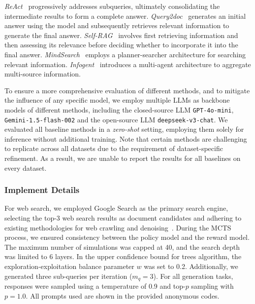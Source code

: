 \quad
\textit{ReAct}~\cite{yao2023react} progressively addresses subqueries, ultimately consolidating the intermediate results to form a complete answer.
\textit{Query2doc}~\cite{wang2023query2doc} generates an initial answer using the model and subsequently retrieves relevant information to generate the final answer.
\textit{Self-RAG}~\cite{asaiself} involves first retrieving information and then assessing its relevance before deciding whether to incorporate it into the final answer.
\textit{MindSearch}~\cite{chen2024mindsearch} employs a planner-searcher architecture for searching relevant information.
\textit{Infogent}~\cite{reddy2024infogent} introduces a multi-agent architecture to aggregate multi-source information.


To ensure a more comprehensive evaluation of different methods, and to mitigate the influence of any specific model, we employ multiple LLMs as backbone models of different methods, including the closed-source LLM \texttt{GPT-4o-mini}, \texttt{Gemini-1.5-flash-002} and the open-source LLM \texttt{deepseek-v3-chat}.
We evaluated all baseline methods in a \textit{zero-shot} setting, employing them solely for inference without additional training.
Note that certain methods are challenging to replicate across all datasets due to the requirement of dataset-specific refinement. As a result, we are unable to report the results for all baselines on every dataset.


\subsubsection{Implement Details}

For web search, we employed Google Search as the primary search engine, selecting the top-3 web search results as document candidates and adhering to existing methodologies for web crawling and denoising~\cite{reddy2024infogent}. During the MCTS process, we ensured consistency between the policy model and the reward model. The maximum number of simulations was capped at 40, and the search depth was limited to 6 layers. In the upper confidence bound for trees algorithm, the exploration-exploitation balance parameter \( w \) was set to 0.2. Additionally, we generated three sub-queries per iteration (\( m_q = 3 \)).
For all generation tasks, responses were sampled using a temperature of 0.9 and top-\( p \) sampling with \( p = 1.0 \).  All prompts used are shown in the provided anonymous codes.




